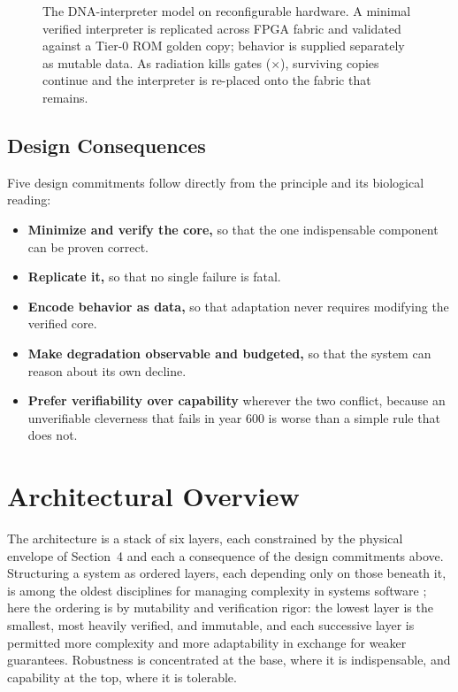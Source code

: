 \documentclass[10pt, a4paper]{article}
\begin{document}
\begin{figure}[ht]
\caption{The DNA-interpreter model on reconfigurable hardware. A minimal verified interpreter is replicated across FPGA fabric and validated against a Tier-0 ROM golden copy; behavior is supplied separately as mutable data. As radiation kills gates ($\times$), surviving copies continue and the interpreter is re-placed onto the fabric that remains.}
\label{fig:dna}
\end{figure}

\subsection{Design Consequences}

Five design commitments follow directly from the principle and its biological reading:

\begin{itemize}
\setlength{\itemsep}{2pt}
\item \textbf{Minimize and verify the core,} so that the one indispensable component can be proven correct.
\item \textbf{Replicate it,} so that no single failure is fatal.
\item \textbf{Encode behavior as data,} so that adaptation never requires modifying the verified core.
\item \textbf{Make degradation observable and budgeted,} so that the system can reason about its own decline.
\item \textbf{Prefer verifiability over capability} wherever the two conflict, because an unverifiable cleverness that fails in year 600 is worse than a simple rule that does not.
\end{itemize}

\section{Architectural Overview}

The architecture is a stack of six layers, each constrained by the physical envelope of Section~4 and each a consequence of the design commitments above. Structuring a system as ordered layers, each depending only on those beneath it, is among the oldest disciplines for managing complexity in systems software \cite{dijkstra1968}; here the ordering is by mutability and verification rigor: the lowest layer is the smallest, most heavily verified, and immutable, and each successive layer is permitted more complexity and more adaptability in exchange for weaker guarantees. Robustness is concentrated at the base, where it is indispensable, and capability at the top, where it is tolerable.
\end{document}

